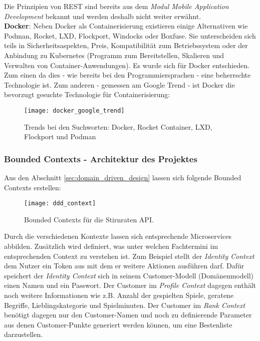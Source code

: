 {Die Prinzipien von REST sind bereits aus dem \textit{Modul Mobile Application Development} bekannt und werden deshalb nicht weiter erwähnt. \\

\textbf{Docker}: Neben Docker als Containerisierung existieren einige Alternativen wie Podman, Rocket, LXD, Flockport, Windocks oder Boxfuse. Sie unterscheiden sich teils in Sicherheitsaspekten, Preis, Kompatibilität zum Betriebssystem oder der Anbindung zu Kubernetes (Programm zum Bereitstellen, Skalieren und Verwalten von Container-Anwendungen).\cite{heise2019Podman}\cite{t3n2017Container} Es wurde sich für Docker entschieden. Zum einen da dies - wie bereits bei den Programmiersprachen - eine beherrschte Technologie ist. Zum anderen - gemessen am Google Trend - ist Docker die bevorzugt gesuchte Technologie für Containerisierung:  

\begin{figure}[ht]
	\centering
	\texttt{[image: docker\_google\_trend]}
	\caption[Docker Google Trends] {Trends bei den Suchworten: Docker, Rocket Container, LXD, Flockport und Podman}
	\label{fig:docker_google_trends}
\end{figure}

\subsubsection{Bounded Contexts - Architektur des Projektes}
Aus den Abschnitt \ref{sec:domain_driven_design} lassen sich folgende Bounded Contexts erstellen: 

\begin{figure}[ht]
	\centering
	\texttt{[image: ddd\_context]}
	\caption[Bounded Contexts für Stirnraten] {Bounded Contexts für die Stirnraten API.}
	\label{fig:ddd_context}
\end{figure}

Durch die verschiedenen Kontexte lassen sich entsprechende Microservices abbilden. Zusätzlich wird definiert, was unter welchen Fachtermini im entsprechenden Context zu verstehen ist. Zum Beispiel stellt der \textit{Identity Context} dem Nutzer ein Token aus mit dem er weitere Aktionen ausführen darf. Dafür speichert der \textit{Identity Context} sich in seinem Customer-Modell (Domänenmodell) einen Namen und ein Passwort. Der Customer im \textit{Profile Context} dagegen enthält noch weitere Informationen wie z.B. Anzahl der gespielten Spiele, geratene Begriffe, Lieblingskategorie und Spielminuten. Der Customer im \textit{Rank Context} benötigt dagegen nur den Customer-Namen und noch zu definierende Parameter aus denen Customer-Punkte generiert werden können, um eine Bestenliste darzustellen.\\

}

